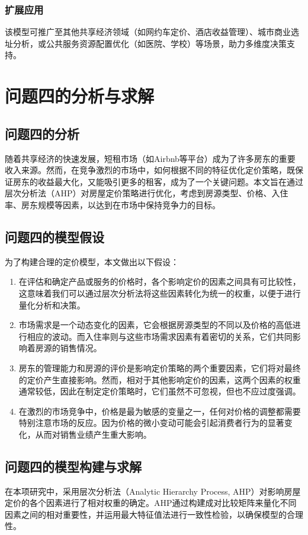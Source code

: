 \documentclass[12pt]{article}
\begin{document}
\begin{CJK}{UTF8}{gbsn}
	\subsubsection{扩展应用}
	该模型可推广至其他共享经济领域（如网约车定价、酒店收益管理）、城市商业选址分析，或公共服务资源配置优化（如医院、学校）等场景，助力多维度决策支持。
	
	
	\section{问题四的分析与求解}
	
	\subsection{问题四的分析}
	随着共享经济的快速发展，短租市场（如Airbnb等平台）成为了许多房东的重要收入来源。然而，在竞争激烈的市场中，如何根据不同的特征优化定价策略，既保证房东的收益最大化，又能吸引更多的租客，成为了一个关键问题。本文旨在通过层次分析法（AHP）对房屋定价策略进行优化，考虑到房源类型、价格、入住率、房东规模等因素，以达到在市场中保持竞争力的目标。
	
	\subsection{问题四的模型假设}
	为了构建合理的定价模型，本文做出以下假设：
	\begin{enumerate}
		\item 在评估和确定产品或服务的价格时，各个影响定价的因素之间具有可比较性，这意味着我们可以通过层次分析法将这些因素转化为统一的权重，以便于进行量化分析和决策。
		\item 市场需求是一个动态变化的因素，它会根据房源类型的不同以及价格的高低进行相应的波动。而入住率则与这些市场需求因素有着密切的关系，它们共同影响着房源的销售情况。
		\item 房东的管理能力和房源的评价是影响定价策略的两个重要因素，它们将对最终的定价产生直接影响。然而，相对于其他影响定价的因素，这两个因素的权重通常较低，因此在制定定价策略时，它们虽然不可忽视，但也不应过度强调。
		\item 在激烈的市场竞争中，价格是最为敏感的变量之一，任何对价格的调整都需要特别注意市场的反应。因为价格的微小变动可能会引起消费者行为的显著变化，从而对销售业绩产生重大影响。
	\end{enumerate}
	
	\subsection{问题四的模型构建与求解}
	在本项研究中，采用层次分析法（Analytic Hierarchy Process, AHP）对影响房屋定价的各个因素进行了相对权重的确定。AHP通过构建成对比较矩阵来量化不同因素之间的相对重要性，并运用最大特征值法进行一致性检验，以确保模型的合理性。
	

\end{CJK}
\end{document}

